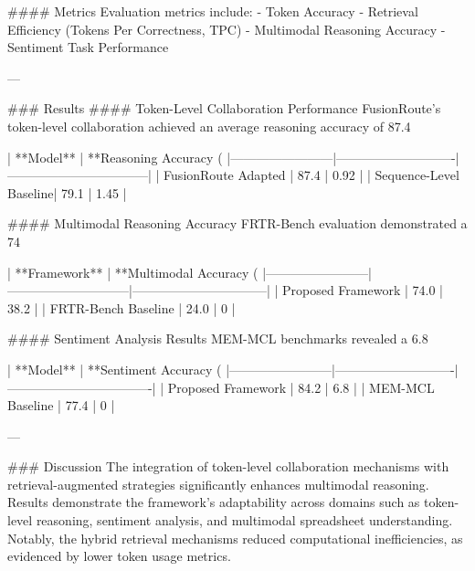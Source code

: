#### Metrics  
Evaluation metrics include:  
- Token Accuracy  
- Retrieval Efficiency (Tokens Per Correctness, TPC)  
- Multimodal Reasoning Accuracy  
- Sentiment Task Performance  

---

### Results  
#### Token-Level Collaboration Performance  
FusionRoute’s token-level collaboration achieved an average reasoning accuracy of 87.4%

| **Model**             | **Reasoning Accuracy (%
|------------------------|----------------------------|---------------------------------|
| FusionRoute Adapted    | 87.4                      | 0.92                          |
| Sequence-Level Baseline| 79.1                      | 1.45                          |

#### Multimodal Reasoning Accuracy  
FRTR-Bench evaluation demonstrated a 74%

| **Framework**         | **Multimodal Accuracy (%
|------------------------|-----------------------------|--------------------------------|
| Proposed Framework     | 74.0                       | 38.2                          |
| FRTR-Bench Baseline    | 24.0                       | 0                             |

#### Sentiment Analysis Results  
MEM-MCL benchmarks revealed a 6.8%

| **Model**             | **Sentiment Accuracy (%
|------------------------|----------------------------|----------------------------------|
| Proposed Framework     | 84.2                      | 6.8                            |
| MEM-MCL Baseline       | 77.4                      | 0                              |

---

### Discussion  
The integration of token-level collaboration mechanisms with retrieval-augmented strategies significantly enhances multimodal reasoning. Results demonstrate the framework’s adaptability across domains such as token-level reasoning, sentiment analysis, and multimodal spreadsheet understanding. Notably, the hybrid retrieval mechanisms reduced computational inefficiencies, as evidenced by lower token usage metrics.

